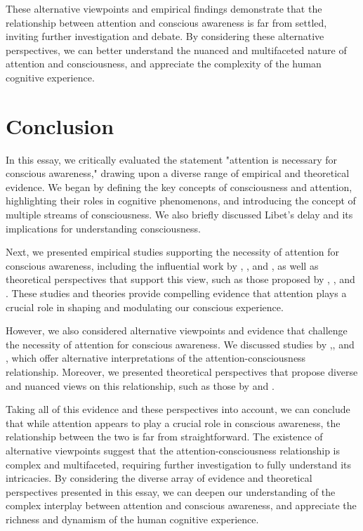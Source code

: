 \documentclass[10pt]{article}
\begin{document}
\begin{sloppypar}
  These alternative viewpoints and empirical findings demonstrate that the relationship between attention and conscious awareness is far from settled, inviting further investigation and debate. By considering these alternative perspectives, we can better understand the nuanced and multifaceted nature of attention and consciousness, and appreciate the complexity of the human cognitive experience.

  \section{Conclusion}
  \label{sec:conclusion}

  In this essay, we critically evaluated the statement "attention is necessary for conscious awareness," drawing upon a diverse range of empirical and theoretical evidence. We began by defining the key concepts of consciousness and attention, highlighting their roles in cognitive phenomenons, and introducing the concept of multiple streams of consciousness. We also briefly discussed Libet’s delay and its implications for understanding consciousness.

  Next, we presented empirical studies supporting the necessity of attention for conscious awareness, including the influential work by \cite{cohen_attentional_2012}, \cite{kentridge_spatial_2004}, and \cite{sumner_attentional_2006}, as well as theoretical perspectives that support this view, such as those proposed by \cite{baars_essential_1997}, \cite{de_brigard_role_2012}, and \cite{dijksterhuis_goals_2010}. These studies and theories provide compelling evidence that attention plays a crucial role in shaping and modulating our conscious experience.

  However, we also considered alternative viewpoints and evidence that challenge the necessity of attention for conscious awareness. We discussed studies by \cite{aru_phenomenal_2013},\cite{kentridge_attended_2008}, and \cite{kozuch_gorillas_2018}, which offer alternative interpretations of the attention-consciousness relationship. Moreover, we presented theoretical perspectives that propose diverse and nuanced views on this relationship, such as those by \cite{montemayor_types_2021} and \cite{noah_recent_2020}.

  Taking all of this evidence and these perspectives into account, we can conclude that while attention appears to play a crucial role in conscious awareness, the relationship between the two is far from straightforward. The existence of alternative viewpoints suggest that the attention-consciousness relationship is complex and multifaceted, requiring further investigation to fully understand its intricacies. By considering the diverse array of evidence and theoretical perspectives presented in this essay, we can deepen our understanding of the complex interplay between attention and conscious awareness, and appreciate the richness and dynamism of the human cognitive experience.

  \pagebreak
  \singlespacing %
  
  

\end{sloppypar}
\end{document}
